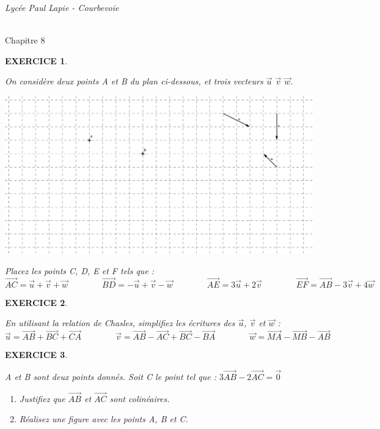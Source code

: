 \documentclass[a4paper]{article}   %
\renewcommand{\(}{\left(}
\renewcommand{\)}{\right)}
\newtheorem{EXO}{\large EXERCICE }
\newenvironment{EX}   { \setcounter{ques}{0} \begin{EXO} \hrulefill ~\vspace{0.3cm}

\normalfont}    {\end{EXO} \medskip}
\def\v{\overrightarrow}	%
\def\cl{{\Large \bf{2nde}}}
\begin{document}
\newpage
\setcounter{EXO}{0}

\noindent\begin{minipage}{.20\linewidth}\begin{center}                  
\noindent \emph{Lycée Paul Lapie - Courbevoie}
\end{center}\end{minipage}
\begin{minipage}{1.5\linewidth}\begin{center}	
\noindent \cl\\ Chapitre 8
\end{center}\end{minipage}

\begin{center} 	
\end{center}

\begin{EX}  On considère deux points A et B du plan ci-dessous, et trois vecteurs $\v{u}$ $\v{v}$ $\v{w}$.
\begin{center}
\includegraphics[width=17cm]{8bex1.png}
\end{center}
Placez les points C, D, E et F tels que :
$$\v{AC}=\v{u}+\v{v}+\v{w} \quad \quad \quad \quad \v{BD}=-\v{u}+\v{v}-\v{w} \quad \quad \quad \quad \v{AE}=3\v{u}+2\v{v} \quad \quad \quad \quad \v{EF}=\v{AB}-3\v{v}+4\v{w}$$
\end{EX}

\begin{EX}  En utilisant la relation de Chasles, simplifiez les écritures des $\v{u}$, $\v{v}$ et $\v{w}$ :
$$\v{u}=\v{AB}+\v{BC}+\v{CA} \quad \quad \quad \quad \v{v}=\v{AB}-\v{AC}+\v{BC}-\v{BA} \quad \quad \quad \quad \v{w}=\v{MA}-\v{MB}-\v{AB}$$
\end{EX}

\begin{EX} A et B sont deux points donnés. Soit C le point tel que : $3\v{AB}-2\v{AC}=\v{0}$
\begin{enumerate}
\item  Justifiez que $\v{AB}$ et $\v{AC}$ sont colinéaires.
\item Réalisez une figure avec les points A, B et C.
\end{enumerate}\end{EX}
\end{document}
